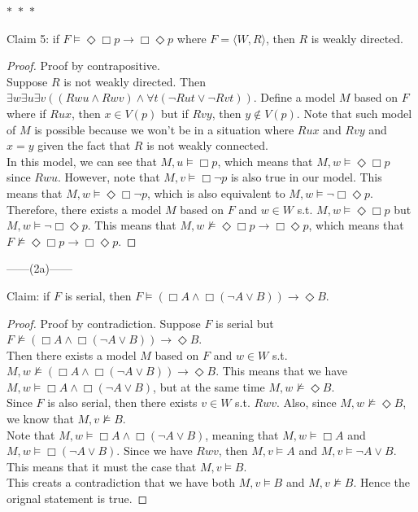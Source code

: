 \documentclass[12pt]{article}
\newcommand{\B}{\Box}
\newcommand{\D}{\Diamond}
\newcommand{\s}{\vDash}
\newcommand{\ns}{\nvDash}
\begin{document}
\noindent
\begin{center}
    $\ast$~$\ast$~$\ast$
\end{center}
Claim 5: if $F \vDash \D \B p \to \B \D p$ where $F = \langle W, R \rangle$, then $R$ is weakly directed. 
\begin{proof} Proof by contrapositive.\\
    Suppose $R$ is not weakly directed.
    Then $\exists w \exists u \exists v ((Rwu \land Rwv) \land \forall t(\neg Rut \lor \neg Rvt))$.
    Define a model $M$ based on $F$ where if $Rux$, then $x \in V(p)$ but if $Rvy$, then $y \notin V(p)$.
    Note that such model of $M$ is possible because we won't be in a situation where $Rux$ and $Rvy$ and $x = y$ given the fact that $R$ is not weakly connected.\\
    In this model, we can see that $M, u \s \B p$, which means that $M, w \s \D \B p$ since $Rwu$.
    However, note that $M, v \s \B \neg p$ is also true in our model. 
    This means that $M, w \s \D \B \neg p$, which is also equivalent to $M, w \s \neg \B \D p$.\\
    Therefore, there exists a model $M$ based on $F$ and $w \in W$ s.t. $M, w \s \D \B p$ but $M, w \s \neg \B \D p$.
    This means that $M, w \ns \D \B p \to \B \D p$, which means that $F \ns \D \B p \to \B \D p$.

\end{proof}

\newpage
\noindent
\begin{center}
    ------(2a)------
\end{center}
Claim: if $F$ is serial, then $F \s (\B A \land \B (\neg A \lor B)) \to \D B$.
\begin{proof} Proof by contradiction.
    Suppose $F$ is serial but $F \ns (\B A \land \B (\neg A \lor B)) \to \D B$.\\
    Then there exists a model $M$ based on $F$ and $w \in W$ s.t. $M, w \ns (\B A \land \B (\neg A \lor B)) \to \D B$.
    This means that we have $M, w \s \B A \land \B (\neg A \lor B)$, but at the same time $M, w \ns \D B$.\\
    Since $F$ is also serial, then there exists $v \in W$ s.t. $Rwv$. 
    Also, since $M, w \ns \D B$, we know that $M, v \ns B$.\\
    Note that $M, w \s \B A \land \B (\neg A \lor B)$, meaning that $M, w \s \B A$ and $M, w \s \B (\neg A \lor B)$. 
    Since we have $Rwv$, then $M, v \s A$ and $M, v \s \neg A \lor B$.
    This means that it must the case that $M, v \s B$.\\
    This creats a contradiction that we have both $M,v \s B$ and $M, v \ns B$.
    Hence the orignal statement is true.
\end{proof}
\end{document}
